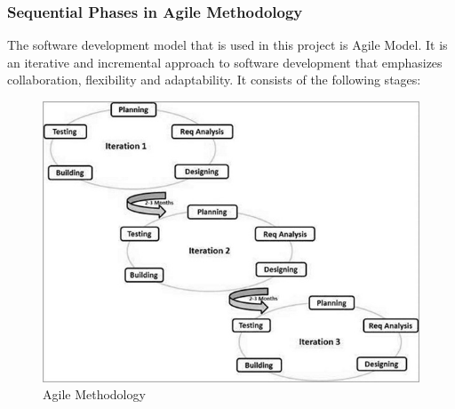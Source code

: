 \documentclass[oneside, 12pt]{book}
\begin{document}
\subsubsection{Sequential Phases in Agile Methodology}
The software development model that is used in this project is Agile Model. It is an iterative and incremental approach to software development that emphasizes collaboration, flexibility and adaptability. It consists of the following stages:
\begin{figure}[H]
	\includegraphics[width=\linewidth]{./Resources/agile.png}
	\caption{Agile Methodology}
	\label{fig:agile}
\end{figure}
\end{document}
